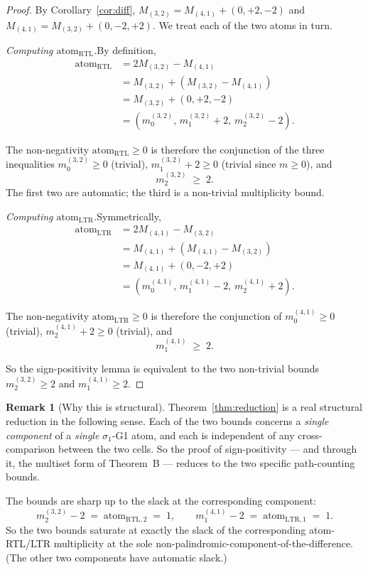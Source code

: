 \documentclass[11pt]{article}
\theoremstyle{definition}
\newtheorem{remark}[theorem]{Remark}
\begin{document}
\begin{proof}
By Corollary~\ref{cor:diff}, $M_{(3,2)} = M_{(4,1)} + (0, +2, -2)$ and $M_{(4,1)} = M_{(3,2)} + (0, -2, +2)$. We treat each of the two atoms in turn.

\medskip\noindent
\emph{Computing $\mathrm{atom}_{\mathrm{RTL}}$.}\quad By definition,
\begin{align*}
\mathrm{atom}_{\mathrm{RTL}} &= 2 M_{(3,2)} - M_{(4,1)} \\
&= M_{(3,2)} + (M_{(3,2)} - M_{(4,1)}) \\
&= M_{(3,2)} + (0, +2, -2) \\
&= (m^{(3,2)}_0, \, m^{(3,2)}_1 + 2, \, m^{(3,2)}_2 - 2).
\end{align*}

The non-negativity $\mathrm{atom}_{\mathrm{RTL}} \geq 0$ is therefore the conjunction of the three inequalities $m^{(3,2)}_0 \geq 0$ (trivial), $m^{(3,2)}_1 + 2 \geq 0$ (trivial since $m \geq 0$), and
\[
m^{(3,2)}_2 \;\geq\; 2.
\]
The first two are automatic; the third is a non-trivial multiplicity bound.

\medskip\noindent
\emph{Computing $\mathrm{atom}_{\mathrm{LTR}}$.}\quad Symmetrically,
\begin{align*}
\mathrm{atom}_{\mathrm{LTR}} &= 2 M_{(4,1)} - M_{(3,2)} \\
&= M_{(4,1)} + (M_{(4,1)} - M_{(3,2)}) \\
&= M_{(4,1)} + (0, -2, +2) \\
&= (m^{(4,1)}_0, \, m^{(4,1)}_1 - 2, \, m^{(4,1)}_2 + 2).
\end{align*}

The non-negativity $\mathrm{atom}_{\mathrm{LTR}} \geq 0$ is therefore the conjunction of $m^{(4,1)}_0 \geq 0$ (trivial), $m^{(4,1)}_2 + 2 \geq 0$ (trivial), and
\[
m^{(4,1)}_1 \;\geq\; 2.
\]

So the sign-positivity lemma is equivalent to the two non-trivial bounds $m^{(3,2)}_2 \geq 2$ and $m^{(4,1)}_1 \geq 2$.
\end{proof}

\begin{remark}[Why this is structural]\label{rem:structural}
Theorem~\ref{thm:reduction} is a real structural reduction in the following sense. Each of the two bounds concerns a \emph{single component} of a \emph{single} $\sigma_1$-G1 atom, and each is independent of any cross-comparison between the two cells. So the proof of sign-positivity --- and through it, the multiset form of Theorem~B --- reduces to the two specific path-counting bounds.

The bounds are sharp up to the slack at the corresponding component:
\[
m^{(3,2)}_2 - 2 \;=\; \mathrm{atom}_{\mathrm{RTL},2} \;=\; 1, \qquad
m^{(4,1)}_1 - 2 \;=\; \mathrm{atom}_{\mathrm{LTR},1} \;=\; 1.
\]
So the two bounds saturate at exactly the slack of the corresponding atom-RTL/LTR multiplicity at the sole non-palindromic-component-of-the-difference. (The other two components have automatic slack.)
\end{remark}
\end{document}
